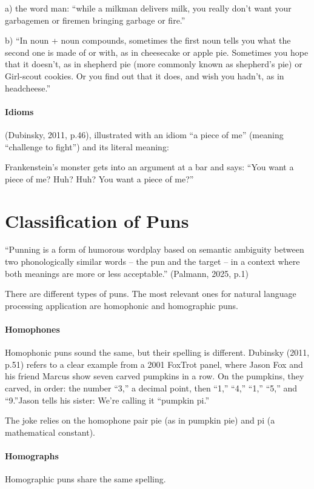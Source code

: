 \documentclass[10pt]{article}
\begin{document}
a)	the word man: “while a milkman delivers milk, you really don’t want your garbagemen or firemen bringing garbage or fire.”

b)	“In noun + noun compounds, sometimes the first noun tells you what the second one is made of or with, as in cheesecake or apple pie. Sometimes you hope that it doesn’t, as in shepherd pie (more commonly known as shepherd’s pie) or Girl-scout cookies. Or you find out that it does, and wish you hadn’t, as in headcheese.”

\paragraph{Idioms}  (Dubinsky, 2011, p.46), illustrated with an idiom “a piece of me” (meaning “challenge to fight”) and its literal meaning:

Frankenstein’s monster gets into an argument at a bar and says: “You want a piece of me? Huh? Huh? You want a piece of me?”




\section{Classification of Puns}\label{key}
“Punning is a form of humorous wordplay based on semantic ambiguity between two phonologically similar words – the pun and the target – in a context where both meanings are more or less acceptable.” (Palmann, 2025, p.1)

There are different types of puns. The most relevant ones for natural language processing application are homophonic and homographic puns.


\paragraph{Homophones} Homophonic puns sound the same, but their spelling is different. 
Dubinsky (2011, p.51) refers to a clear example from a 2001 FoxTrot panel, where Jason Fox and his friend Marcus show seven carved pumpkins in a row.  On the pumpkins, they carved, in order: the number “3,” a decimal point, then “1,” “4,” “1,” “5,” and “9.”Jason tells his sister: We’re calling it “pumpkin pi.”

The joke relies on the homophone pair pie (as in pumpkin pie) and pi (a mathematical constant). 

\paragraph{Homographs} Homographic puns share the same spelling. 
\end{document}
